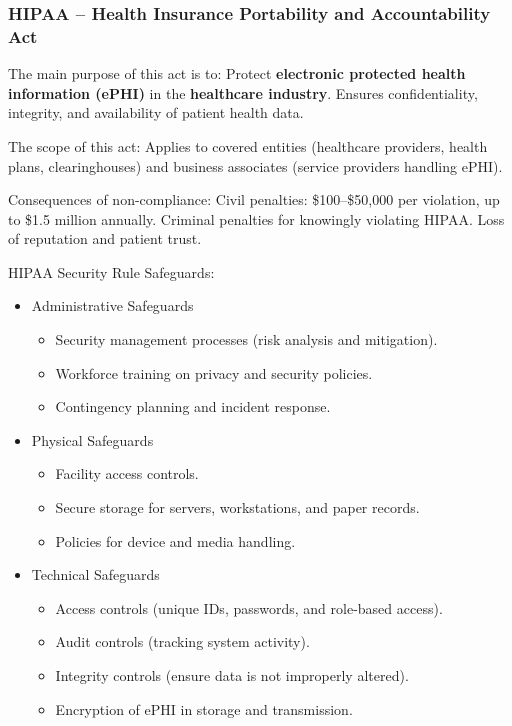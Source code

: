 \subsubsection{HIPAA – Health Insurance Portability and Accountability Act}

\indent 

The main purpose of this act is to: Protect \textbf{electronic protected health information (ePHI)} in the \textbf{healthcare industry}. Ensures confidentiality, integrity, and availability of patient health data.

The scope of this act: Applies to covered entities (healthcare providers, health plans, clearinghouses) and business associates (service providers handling ePHI).

Consequences of non-compliance: Civil penalties: \$100–\$50,000 per violation, up to \$1.5 million annually. Criminal penalties for knowingly violating HIPAA. Loss of reputation and patient trust.

HIPAA Security Rule Safeguards:

\begin{itemize}
    \item Administrative Safeguards
        \begin{itemize}
            \item Security management processes (risk analysis and mitigation).
            \item Workforce training on privacy and security policies.
            \item Contingency planning and incident response.
        \end{itemize}
    \item Physical Safeguards
        \begin{itemize}
            \item Facility access controls.
            \item Secure storage for servers, workstations, and paper records.
            \item Policies for device and media handling.
        \end{itemize}
    \item Technical Safeguards
        \begin{itemize}
            \item Access controls (unique IDs, passwords, and role-based access).
            \item Audit controls (tracking system activity).
            \item Integrity controls (ensure data is not improperly altered).
            \item Encryption of ePHI in storage and transmission.
        \end{itemize}
\end{itemize}

